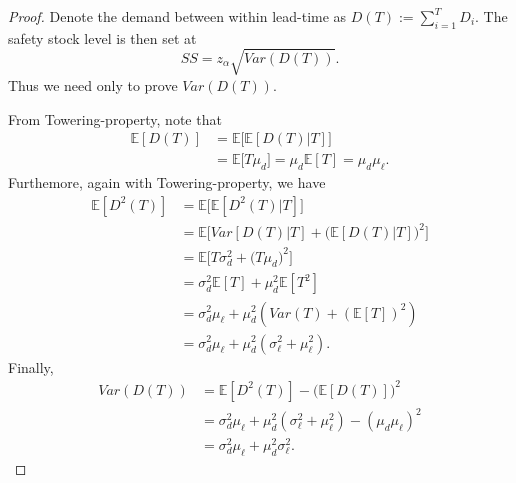 \documentclass[10pt]{article}
\theoremstyle{remark}
\theoremstyle{plain}
\numberwithin{equation}{section}
\begin{document}
\begin{proof}
	Denote the demand between within lead-time as $D(T) := \sum_{i=1}^T D_i$. The safety stock level is then set at
	\[
	SS = z_\alpha \sqrt{Var(D(T))}.
	\]
	Thus we need only to prove $Var(D(T))$. 
	
	From Towering-property, note that 
	\begin{align*}
		\mathbb{E}[D(T)] & = \mathbb{E} \big[\mathbb{E}[D(T)|T]\big]\\
		&
		= \mathbb{E}\big[T \mu_d\big] = \mu_d \mathbb{E}[T] = \mu_d \mu_\ell.
	\end{align*}
	Furthemore, again with Towering-property, we have
	\begin{align*}
		\mathbb{E}[D^2(T)] & = \mathbb{E} \big[\mathbb{E}[D^2(T)|T]\big]
		\\
		& = \mathbb{E}\big[Var[D(T)|T] + \big(\mathbb{E}[D(T)|T]\big)^2\big]
		\\			
		& = \mathbb{E}\big[T \sigma_d^2 + \big(T \mu_d \big)^2\big]
		\\
		& = \sigma_d^2 \mathbb{E}[T] + \mu_d^2\mathbb{E}[T^2]
		\\
		& =  \sigma_d^2 \mu_\ell + \mu_d^2\left(Var(T) + (\mathbb{E}[T])^2\right)
		\\
		& = \sigma_d^2 \mu_\ell + \mu_d^2\left(\sigma^2_\ell+ \mu_\ell^2\right).
	\end{align*}
	Finally,
	\begin{align*}
		Var(D(T)) &= \mathbb{E}[D^2(T)] - \big(\mathbb{E}[D(T)]\big)^2
		\\
		& =  \sigma_d^2 \mu_\ell + \mu_d^2\left(\sigma^2_\ell+ \mu_\ell^2\right) - (\mu_d \mu_\ell)^2
		\\
		& = \sigma_d^2 \mu_\ell + \mu_d^2 \sigma^2_\ell.
	\end{align*}
\end{proof}
\clearpage
\end{document}
